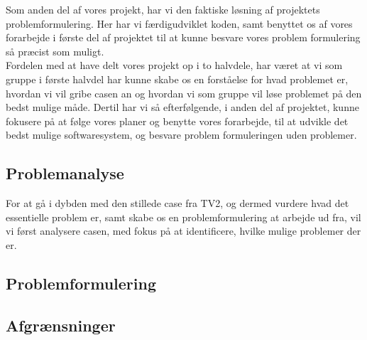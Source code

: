 Som anden del af vores projekt, har vi den faktiske løsning af projektets problemformulering. Her har vi færdigudviklet koden, samt benyttet os af vores forarbejde i første del af projektet til at kunne besvare vores problem formulering så præcist som muligt.\\
Fordelen med at have delt vores projekt op i to halvdele, har været at vi som gruppe i første halvdel har kunne skabe os en forståelse for hvad problemet er, hvordan vi vil gribe casen an og hvordan vi som gruppe vil løse problemet på den bedst mulige måde. Dertil har vi så efterfølgende, i anden del af projektet, kunne fokusere på at følge vores planer og benytte vores forarbejde, til at udvikle det bedst mulige softwaresystem, og besvare problem formuleringen uden problemer.

\subsection{Problemanalyse}
For at gå i dybden med den stillede case fra TV2, og dermed vurdere hvad det essentielle problem er, samt skabe os en problemformulering at arbejde ud fra, vil vi først analysere casen, med fokus på at identificere, hvilke mulige problemer der er. 

\subsection{Problemformulering}
\subsection{Afgrænsninger}
